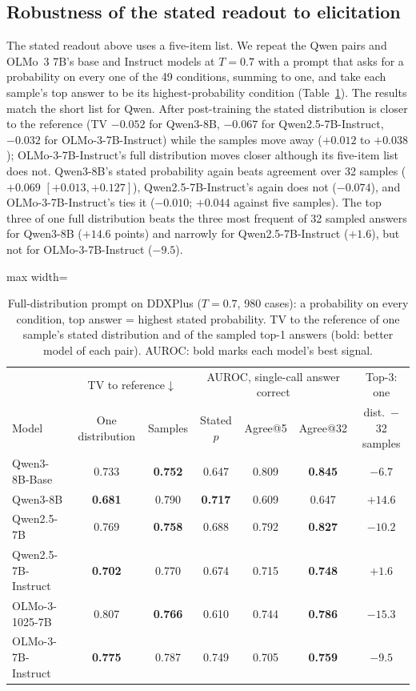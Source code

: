 \documentclass[11pt]{article}
\begin{document}
\subsection{Robustness of the stated readout to elicitation}\label{sec:fullprompt}
The stated readout above uses a five-item list. We repeat the Qwen pairs and OLMo~3 7B's base and Instruct models at $T{=}0.7$ with a prompt that asks for a probability on every one of the 49 conditions, summing to one, and take each sample's top answer to be its highest-probability condition (Table~\ref{tab:fullprompt}).
The results match the short list for Qwen. After post-training the stated distribution is closer to the reference (TV $-0.052$ for Qwen3-8B, $-0.067$ for Qwen2.5-7B-Instruct, $-0.032$ for OLMo-3-7B-Instruct) while the samples move away ($+0.012$ to $+0.038$); OLMo-3-7B-Instruct's full distribution moves closer although its five-item list does not.
Qwen3-8B's stated probability again beats agreement over 32 samples ($+0.069$ $[+0.013,+0.127]$), Qwen2.5-7B-Instruct's again does not ($-0.074$), and OLMo-3-7B-Instruct's ties it ($-0.010$; $+0.044$ against five samples). The top three of one full distribution beats the three most frequent of 32 sampled answers for Qwen3-8B ($+14.6$ points) and narrowly for Qwen2.5-7B-Instruct ($+1.6$), but not for OLMo-3-7B-Instruct ($-9.5$).

\begin{table}[t]
\centering\small
\setlength{\tabcolsep}{4pt}
\begin{adjustbox}{max width=\linewidth}
\begin{tabular}{lcccccc}
\toprule
 & \multicolumn{2}{c}{TV to reference$\downarrow$} & \multicolumn{3}{c}{AUROC, single-call answer correct} & Top-3: one \\
Model & One distribution & Samples & Stated $p$ & Agree@5 & Agree@32 & dist.\ $-$ 32 samples \\
\midrule
Qwen3-8B-Base & 0.733 & \textbf{0.752} & 0.647 & 0.809 & \textbf{0.845} & $-6.7$ \\
Qwen3-8B & \textbf{0.681} & 0.790 & \textbf{0.717} & 0.609 & 0.647 & $+14.6$ \\
Qwen2.5-7B & 0.769 & \textbf{0.758} & 0.688 & 0.792 & \textbf{0.827} & $-10.2$ \\
Qwen2.5-7B-Instruct & \textbf{0.702} & 0.770 & 0.674 & 0.715 & \textbf{0.748} & $+1.6$ \\
OLMo-3-1025-7B & 0.807 & \textbf{0.766} & 0.610 & 0.744 & \textbf{0.786} & $-15.3$ \\
OLMo-3-7B-Instruct & \textbf{0.775} & 0.787 & 0.749 & 0.705 & \textbf{0.759} & $-9.5$ \\
\bottomrule
\end{tabular}
\end{adjustbox}
\caption{Full-distribution prompt on DDXPlus ($T{=}0.7$, 980 cases): a probability on every condition, top answer = highest stated probability. TV to the reference of one sample's stated distribution and of the sampled top-1 answers (bold: better model of each pair). AUROC: bold marks each model's best signal.}
\label{tab:fullprompt}
\end{table}
\end{document}
